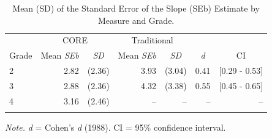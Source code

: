 \documentclass[
  english,
  man, fleqn, noextraspace]{apa6}
\begin{document}
\begin{table}[tbp]

\begin{center}
\begin{threeparttable}

\caption{\label{tab:tbl-seb-results}Mean (SD) of the Standard Error of the Slope (SEb) Estimate by Measure and Grade.}

\begin{tabular}{lrrrrrr}
\toprule
 & \multicolumn{2}{c}{CORE} & \multicolumn{2}{c}{Traditional}  &  &\\
\cmidrule(r){2-3} \cmidrule(r){4-5}
Grade & \multicolumn{1}{c}{Mean \emph{SEb}} & \multicolumn{1}{c}{\emph{SD}} & \multicolumn{1}{c}{Mean \emph{SEb}} & \multicolumn{1}{c}{\emph{SD}} & \multicolumn{1}{c}{\emph{d}} & \multicolumn{1}{c}{CI}\\
\midrule
2 & 2.82 & (2.36) & 3.93 & (3.04) & 0.41 & {}[0.29 - 0.53]\\
3 & 2.88 & (2.36) & 4.32 & (3.38) & 0.55 & {}[0.45 - 0.65]\\
4 & 3.16 & (2.46) & -- & -- & -- & --\\
\bottomrule
\addlinespace
\end{tabular}

\begin{tablenotes}[para]
\normalsize{\textit{Note.} \emph{d} = Cohen's \emph{d} (1988). CI = 95\% confidence interval.}
\end{tablenotes}

\end{threeparttable}
\end{center}

\end{table}
\end{document}
